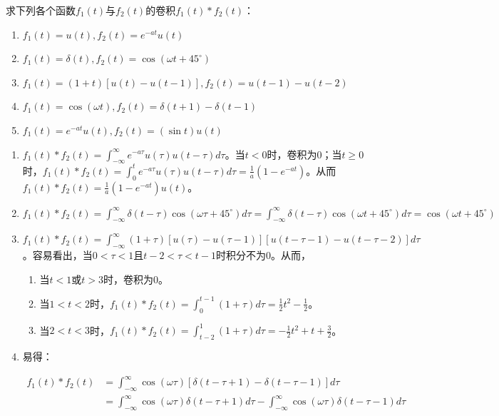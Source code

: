 \documentclass[answers]{exam}  %
\begin{document}
\begin{questions}
\question 求下列各个函数$f_1(t)$与$f_2(t)$的卷积$f_1(t)\ast f_2(t)$：
\begin{enumerate}[(1)]
	\item $f_1(t)=u(t),f_2(t)=e^{-at}u(t)$
	\item $f_1(t)=\delta(t),f_2(t)=\cos (\omega t + 45^{\circ})$
	\item $f_1(t)=(1+t)\left[u(t)-u(t-1)\right],f_2(t)=u(t-1)-u(t-2)$
	\item $f_1(t)=\cos(\omega t),f_2(t)=\delta(t+1)-\delta(t-1)$
	\item $f_1(t)=e^{-at}u(t),f_2(t)=(\sin t)u(t)$
\end{enumerate}


\begin{solution}
	\begin{enumerate}[(1)]
		\item $f_1(t)\ast f_2(t)=\int_{-\infty}^{\infty} e^{-a\tau}u(\tau)u(t-\tau) d\tau$。当$t<0$时，卷积为0；当$t\geq0$时，$f_1(t)\ast f_2(t)=\int_{0}^{t} e^{-a\tau}u(\tau)u(t-\tau) d\tau=\frac{1}{a}(1-e^{-at})$。从而$f_1(t)\ast f_2(t)=\frac{1}{a}(1-e^{-at})u(t)$。
		\item $f_1(t)\ast f_2(t)=\int_{-\infty}^{\infty} \delta(t-\tau)\cos (\omega \tau + 45^{\circ})d\tau=\int_{-\infty}^{\infty} \delta(t-\tau)\cos (\omega t + 45^{\circ})d\tau
		=\cos (\omega t + 45^{\circ})$
		\item $f_1(t)\ast f_2(t)=\int_{-\infty}^{\infty} (1+\tau)[u(\tau)-u(\tau-1)][u(t-\tau-1)-u(t-\tau-2)]d\tau$。容易看出，当$0<\tau<1$且$t-2<\tau<t-1$时积分不为0。从而，
		\begin{enumerate}[$\bullet$]
			\item 当$t<1$或$t>3$时，卷积为0。
			\item 当$1<t<2$时，$f_1(t)\ast f_2(t)=\int_{0}^{t-1} (1+\tau)d\tau=\frac{1}{2}t^2-\frac{1}{2}$。
			\item 当$2<t<3$时，$f_1(t)\ast f_2(t)=\int_{t-2}^{1} (1+\tau)d\tau=-\frac{1}{2}t^2+t+\frac{3}{2}$。
		\end{enumerate}
		\item  易得：        
		       \begin{large}
		       \begin{align*}     	
		       	f_1(t)\ast f_2(t)
			    &= \int_{-\infty}^{\infty}\cos(\omega \tau)[\delta(t-\tau+1)-\delta(t-\tau-1)]d\tau \\
			     &=\int_{-\infty}^{\infty}\cos(\omega \tau)\delta(t-\tau+1)d\tau-\int_{-\infty}^{\infty}\cos(\omega \tau)\delta(t-\tau-1)d\tau\\

\end{align*}
\end{large}
\end{enumerate}
\end{solution}
\end{questions}
\end{document}
